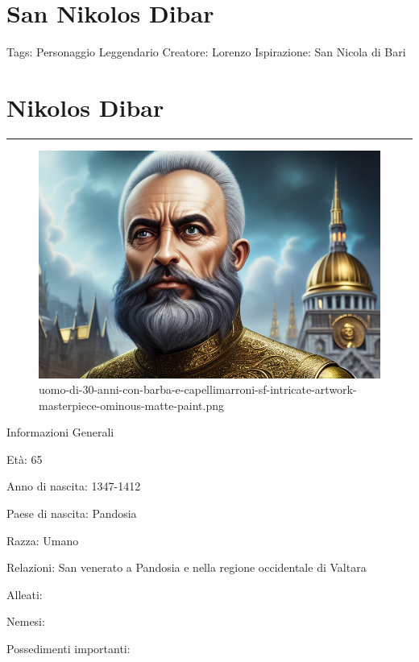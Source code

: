 \section{San Nikolos Dibar}\label{san-nikolos-dibar}

Tags: Personaggio Leggendario Creatore: Lorenzo Ispirazione: San Nicola
di Bari

\section{Nikolos Dibar}\label{nikolos-dibar}

\begin{center}\rule{0.5\linewidth}{0.5pt}\end{center}

\begin{figure}
\centering
\includegraphics{uomo-di-30-anni-con-barba-e-capellimarroni-sf-intricate-artwork-masterpiece-ominous-matte-paint.png}
\caption{uomo-di-30-anni-con-barba-e-capellimarroni-sf-intricate-artwork-masterpiece-ominous-matte-paint.png}
\end{figure}

Informazioni Generali

Età: 65

Anno di nascita: 1347-1412

Paese di nascita: Pandosia

Razza: Umano

Relazioni: San venerato a Pandosia e nella regione occidentale di
Valtara

Alleati:

Nemesi:

Possedimenti importanti:

